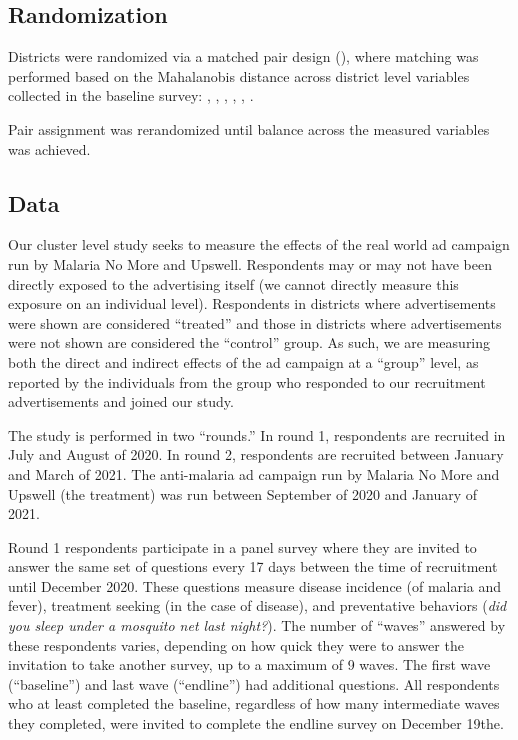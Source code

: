\documentclass[a4paper,12pt]{article}
\theoremstyle{proposition}
\begin{document}
\subsection{Randomization}

Districts were randomized via a matched pair design (\cite{ref}), where matching was performed based on the Mahalanobis distance across district level variables collected in the baseline survey: , , , , , .

Pair assignment was rerandomized until balance across the measured variables was achieved.


\subsection{Data}

Our cluster level study seeks to measure the effects of the real world ad campaign run by Malaria No More and Upswell. Respondents may or may not have been directly exposed to the advertising itself (we cannot directly measure this exposure on an individual level). Respondents in districts where advertisements were shown are considered ``treated'' and those in districts where advertisements were not shown are considered the ``control'' group. As such, we are measuring both the direct and indirect effects of the ad campaign at a ``group'' level, as reported by the individuals from the group who responded to our recruitment advertisements and joined our study.

The study is performed in two ``rounds.'' In round 1, respondents are recruited in July and August of 2020. In round 2, respondents are recruited between January and March of 2021. The anti-malaria ad campaign run by Malaria No More and Upswell (the treatment) was run between September of 2020 and January of 2021.

Round 1 respondents participate in a panel survey where they are invited to answer the same set of questions every 17 days between the time of recruitment until December 2020. These questions measure disease incidence (of malaria and fever), treatment seeking (in the case of disease), and preventative behaviors (\textit{did you sleep under a mosquito net last night?}). The number of ``waves'' answered by these respondents varies, depending on how quick they were to answer the invitation to take another survey, up to a maximum of 9 waves. The first wave (``baseline'') and last wave (``endline'') had additional questions. All respondents who at least completed the baseline, regardless of how many intermediate waves they completed, were invited to complete the endline survey on December 19the.
\end{document}
